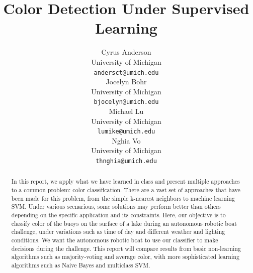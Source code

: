 \documentclass{article} %
\title{Color Detection Under Supervised Learning}
\author{
Cyrus Anderson \\
University of Michigan \\
\texttt{andersct@umich.edu} \\
\And
Jocelyn Bohr \\
University of Michigan \\
\texttt{bjocelyn@umich.edu} \\
\AND
Michael Lu \\
University of Michigan \\
\texttt{lumike@umich.edu} \\
\And
Nghia Vo \\
University of Michigan \\
\texttt{thnghia@umich.edu} \\
}
\begin{document}
\maketitle

\begin{abstract}
In this report, we apply what we have learned in class and present multiple approaches to a common problem: color classification. There are a vast set of approaches that have been made for this problem, from the simple k-nearest neighbors to machine learning SVM. Under various scenarious, some solutions may perform better than others depending on the specific application and its constraints. Here, our objective is to classify color of the buoys on the surface of a lake during an autonomous robotic boat challenge, under variations such as time of day and different weather and lighting conditions. We want the autonomous robotic boat to use our classifier to make decisions during the challenge. This report will compare results from basic non-learning algorithms such as majority-voting and average color, with more sophisticated learning algorithms such as Naive Bayes and multiclass SVM. 
\end{abstract}
\end{document}
